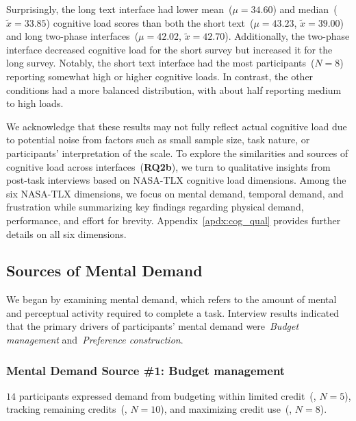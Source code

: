 Surprisingly, the long text interface had lower mean~($\mu=34.60$) and median~($\tilde{x}=33.85$) cognitive load scores than both the short text~($\mu=43.23$, $\tilde{x}=39.00$) and long two-phase interfaces~($\mu=42.02$, $\tilde{x}=42.70$). Additionally, the two-phase interface decreased cognitive load for the short survey but increased it for the long survey. Notably, the short text interface had the most participants~($N=8$) reporting somewhat high or higher cognitive loads. In contrast, the other conditions had a more balanced distribution, with about half reporting medium to high loads.

We acknowledge that these results may not fully reflect actual cognitive load due to potential noise from factors such as small sample size, task nature, or participants' interpretation of the scale. To explore the similarities and sources of cognitive load across interfaces~(\textbf{RQ2b}), we turn to qualitative insights from post-task interviews based on NASA-TLX cognitive load dimensions. Among the six NASA-TLX dimensions, we focus on mental demand, temporal demand, and frustration while summarizing key findings regarding physical demand, performance, and effort for brevity. Appendix~\ref{apdx:cog_qual} provides further details on all six dimensions.

\subsection{Sources of Mental Demand}
\label{sec:mental}
We began by examining mental demand, which refers to the amount of mental and perceptual activity required to complete a task. Interview results indicated that the primary drivers of participants' mental demand were~\textit{Budget management} and~\textit{Preference construction}.

\subsubsection{Mental Demand Source \#1: Budget management} $14$ participants expressed demand from budgeting within limited credit~(, $N=5$), tracking remaining credits~(, $N=10$), and maximizing credit use~(, $N=8$).


